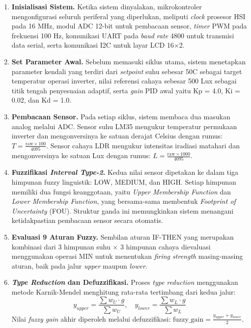 \documentclass[11pt,a4paper]{article}
\begin{document}
\begin{enumerate}
    \item \textbf{Inisialisasi Sistem.} Ketika sistem dinyalakan, mikrokontroler mengonfigurasi seluruh periferal yang diperlukan, meliputi \textit{clock} prosesor HSI pada 16 MHz, modul ADC 12-bit untuk pembacaan sensor, \textit{timer} PWM pada frekuensi 100 Hz, komunikasi UART pada \textit{baud rate} 4800 untuk transmisi data serial, serta komunikasi I2C untuk layar LCD 16$\times$2.

    \item \textbf{Set Parameter Awal.} Sebelum memasuki siklus utama, sistem menetapkan parameter kendali yang terdiri dari \textit{setpoint} suhu sebesar 50\textdegree C sebagai target temperatur operasi inverter, nilai referensi cahaya sebesar 500 Lux sebagai titik tengah penyesuaian adaptif, serta \textit{gain} PID awal yaitu Kp = 4.0, Ki = 0.02, dan Kd = 1.0.

    \item \textbf{Pembacaan Sensor.} Pada setiap siklus, sistem membaca dua masukan analog melalui ADC. Sensor suhu LM35 mengukur temperatur permukaan inverter dan mengonversinya ke satuan derajat Celsius dengan rumus: $T = \frac{\text{raw} \times 100}{4095}$. Sensor cahaya LDR mengukur intensitas iradiasi matahari dan mengonversinya ke satuan Lux dengan rumus: $L = \frac{\text{raw} \times 1000}{4095}$.

    \item \textbf{Fuzzifikasi \textit{Interval Type-2}.} Kedua nilai sensor dipetakan ke dalam tiga himpunan fuzzy linguistik: LOW, MEDIUM, dan HIGH. Setiap himpunan memiliki dua fungsi keanggotaan, yaitu \textit{Upper Membership Function} dan \textit{Lower Membership Function}, yang bersama-sama membentuk \textit{Footprint of Uncertainty} (FOU). Struktur ganda ini memungkinkan sistem menangani ketidakpastian pembacaan sensor secara otomatis.

    \item \textbf{Evaluasi 9 Aturan Fuzzy.} Sembilan aturan IF-THEN yang merupakan kombinasi dari 3 himpunan suhu $\times$ 3 himpunan cahaya dievaluasi menggunakan operasi MIN untuk menentukan \textit{firing strength} masing-masing aturan, baik pada jalur \textit{upper} maupun \textit{lower}.

    \item \textbf{\textit{Type Reduction} dan Defuzzifikasi.} Proses \textit{type reduction} menggunakan metode Karnik-Mendel menghitung rata-rata tertimbang dari kedua jalur:
    \begin{equation}
        y_{upper} = \frac{\sum w_U \cdot g}{\sum w_U}, \quad y_{lower} = \frac{\sum w_L \cdot g}{\sum w_L}
    \end{equation}
    Nilai \textit{fuzzy gain} akhir diperoleh melalui defuzzifikasi: $\text{fuzzy\_gain} = \frac{y_{upper} + y_{lower}}{2}$.


\end{enumerate}
\end{document}
